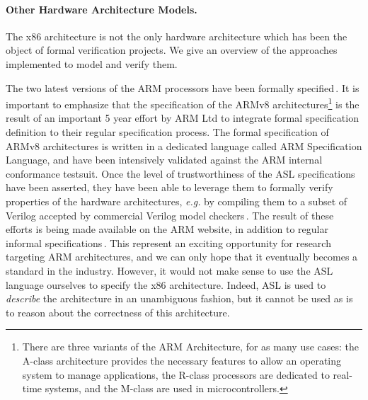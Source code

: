 \paragraph{Other Hardware Architecture Models.}
%
The x86 architecture is not the only hardware architecture which has been the
object of formal verification projects.
%
We give an overview of the approaches implemented to model and verify them.

The two latest versions of the ARM processors have been formally
specified\,\cite{fox2010armv7,reid2016armv8}.
%
It is important to emphasize that the specification of the ARMv8
architectures\footnote{There are three variants of the ARM Architecture, for as
  many use cases: the A-class architecture provides the necessary features to
  allow an operating system to manage applications, the R-class processors are
  dedicated to real-time systems, and the M-class are used in microcontrollers.}
is the result of an important 5 year effort by ARM Ltd to integrate formal
specification definition to their regular specification process.
%
The formal specification of ARMv8 architectures is written in a dedicated
language called ARM Specification Language, and have been intensively validated
against the ARM internal conformance testsuit.
%
Once the level of trustworthiness of the ASL specifications have been asserted,
they have been able to leverage them to formally verify properties of the
hardware architectures, \emph{e.g.} by compiling them to a subset of Verilog
accepted by commercial Verilog model checkers\,\cite{reid2016end}.
%
The result of these efforts is being made available on the ARM website, in
addition to regular informal specifications\,\cite{arm2018aspec}.
%
This represent an exciting opportunity for research targeting ARM architectures,
and we can only hope that it eventually becomes a standard in the industry.
%
However, it would not make sense to use the ASL language ourselves to specify
the x86 architecture.
%
Indeed, ASL is used to \emph{describe} the architecture in an unambiguous
fashion, but it cannot be used as is to reason about the correctness of this
architecture.

